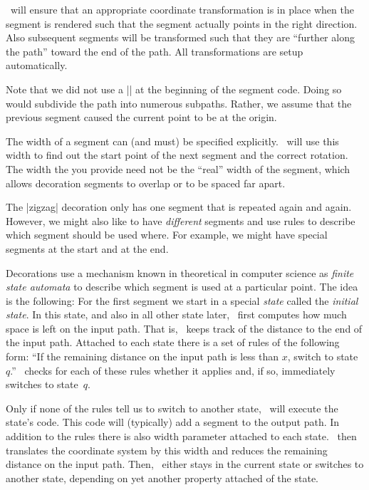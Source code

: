 \pgfname\ will ensure that an appropriate coordinate transformation
is in place when the segment is rendered such that
the segment actually points in the right direction. Also
subsequent segments will be transformed such that they are
``further along the path'' toward the end of the path.
All transformations are setup automatically.

Note that we did not use a |\pgfpathmoveto{\pgfpointorigin}| at the
beginning of the segment code. Doing so would subdivide the path into
numerous subpaths. Rather, we assume that the previous segment caused
the current point to be at the origin.

The width of a segment can (and must) be specified
explicitly. \pgfname\ will use this width to find out the start point
of the next segment and the correct rotation. The width the you
provide need not be the ``real'' width of the segment, which allows
decoration segments to overlap or to be spaced far apart.

The |zigzag| decoration only has one segment that is repeated again and
again. However, we might also like to have \emph{different} segments
and use rules to describe which segment should be used where. For
example, we might have special segments at the start and at the end.

Decorations use a mechanism known in theoretical in computer science
as \emph{finite state automata} to describe which segment is used at a
particular point. The idea is the following: For the first segment we
start in a special \emph{state} called the \emph{initial state}. In
this state, and also in all other state later, \pgfname\ first
computes how much space is left on the input path. That is, \pgfname\ keeps
track of the distance to the end of the input path. Attached to each state
there is a set of rules of the following form: ``If the remaining
distance on the input path is less than $x$, switch to state~$q$.''
\pgfname\ checks for each of these rules whether it applies and, if
so, immediately switches to state~$q$.

Only if none of the rules tell us to switch to another
state, \pgfname\ will execute the state's code. This code will
(typically) add a segment to the output path. In addition to the rules
there is also width parameter attached to each state. \pgfname\ then
translates the coordinate system by this width and reduces the
remaining distance on the input path. Then, \pgfname\ either stays in
the current state or switches to another state, depending on yet
another property attached of the state.


